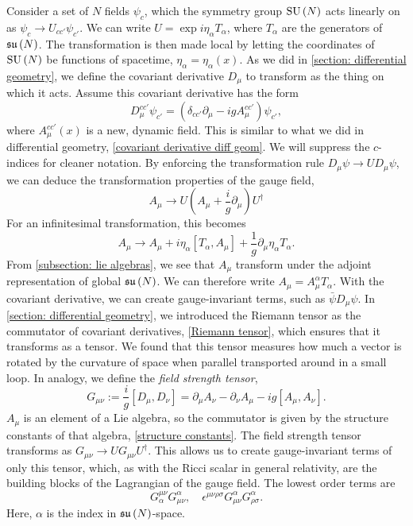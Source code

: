 Consider a set of $N$ fields $\psi_c$, which the symmetry group $\text{SU}\left(N\right)$ acts linearly on as $\psi_c \rightarrow U_{cc'} \psi_{c'}$.
We can write $U = \exp{i \eta_\alpha T_\alpha}$, where $T_\alpha$ are the generators of $\mathfrak{su}\left(N\right)$.
The transformation is then made local by letting the coordinates of $\text{SU}\left(N\right)$ be functions of spacetime, $\eta_\alpha = \eta_\alpha(x)$.
As we did in \autoref{section: differential geometry}, we define the covariant derivative $D_\mu$ to transform as the thing on which it acts.
Assume this covariant derivative has the form
%
\begin{equation}
    \label{covariant derivative Yang-Mills}
    D_\mu^{cc'} \psi_{c'} = (\delta_{cc'}\partial_\mu - i g A_\mu^{cc'} )\psi_{c'},
\end{equation}
%
where $A_\mu^{cc'}(x)$ is a new, dynamic field.
This is similar to what we did in differential geometry, \autoref{covariant derivative diff geom}.
We will suppress the $c$-indices for cleaner notation.
By enforcing the transformation rule $D_\mu \psi \rightarrow U D_\mu \psi$, we can deduce the transformation properties of the gauge field, 
%
\begin{equation}
    \label{Gauge transformation gauge field}
    A_\mu\rightarrow U \left(A_\mu + \frac{i}{g} \partial_\mu\right) U^\dagger
\end{equation}
%
For an infinitesimal transformation, this becomes
%
\begin{equation}
    A_\mu \rightarrow A_\mu + i \eta_\alpha [T_\alpha, A_\mu] + \frac{1}{g} \partial_\mu \eta_\alpha T_\alpha.
\end{equation}
%
From \autoref{subsection: lie algebras}, we see that $A_\mu$ transform under the adjoint representation of global $\mathfrak{su}\left(N\right)$.
We can therefore write $A_\mu = A_\mu^\alpha T_\alpha$.
With the covariant derivative, we can create gauge-invariant terms, such as $\bar \psi D_\mu \psi$.
In \autoref{section: differential geometry}, we introduced the Riemann tensor as the commutator of covariant derivatives, \autoref{Riemann tensor}, which ensures that it transforms as a tensor.
We found that this tensor measures how much a vector is rotated by the curvature of space when parallel transported around in a small loop.
In analogy, we define the \emph{field strength tensor},
%
\begin{equation}
    G_{\mu \nu} := \frac{i}{g} [D_\mu, D_\nu]
    = \partial_\mu A_\nu - \partial_\nu A_\mu - i g[A_\mu, A_\nu].
\end{equation}
%
$A_\mu$ is an element of a Lie algebra, so the commutator is given by the structure constants of that algebra, \autoref{structure constants}.
The field strength tensor transforms as $G_{\mu\nu} \rightarrow U G_{\mu \nu}U^\dagger$.
This allows us to create gauge-invariant terms of only this tensor, which, as with the Ricci scalar in general relativity, are the building blocks of the Lagrangian of the gauge field.
The lowest order terms are
%
\begin{equation}
    G^{\mu \nu}_\alpha G_{\mu \nu}^\alpha, \quad
    \epsilon^{\mu \nu \rho \sigma} G_{\mu \nu}^\alpha G_{\rho \sigma}^\alpha.
\end{equation}
%
Here, $\alpha$ is the index in $\mathfrak{su}\left(N\right)$-space.



